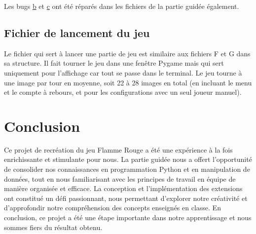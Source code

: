 \documentclass{article}
\begin{document}
Les bugs \underline{b} et \underline{c} ont été réparés dans les fichiers de la partie guidée également.

\subsection{Fichier de lancement du jeu}

Le fichier qui sert à lancer une partie de jeu est similaire aux fichiers F et G dans sa structure. Il fait tourner le jeu dans une fenêtre Pygame mais qui sert uniquement pour l'affichage car tout se passe dans le terminal. Le jeu tourne à une image par tour en moyenne, soit 22 à 28 images en total (en incluant le menu et le compte à rebours, et pour les configurations avec un seul joueur manuel).

\section{Conclusion}

Ce projet de recréation du jeu Flamme Rouge a été une expérience à la fois enrichissante et stimulante pour nous. La partie guidée nous a offert l'opportunité de consolider nos connaissances en programmation Python et en manipulation de données, tout en nous familiarisant avec les principes de travail en équipe de manière organisée et efficace. La conception et l'implémentation des extensions ont constitué un défi passionnant, nous permettant d'explorer notre créativité et d'approfondir notre compréhension des concepts enseignés en classe. En conclusion, ce projet a été une étape importante dans notre apprentissage et nous sommes fiers du résultat obtenu.
\end{document}
